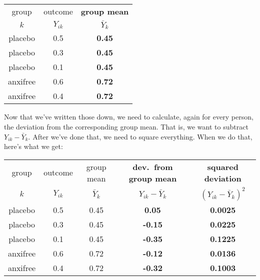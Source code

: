 \small
\vspace*{6pt}
\begin{tabular}{c|c|c} %
 group & outcome  & {\bf group mean} \\%
  $k$ &  $Y_{ik}$  & $\bar{Y}_k$ \\ \hline %
placebo  & 0.5  & {\bf 0.45} \\%
placebo  & 0.3 &  {\bf 0.45} \\%
placebo  &  0.1 &  {\bf 0.45} \\%
anxifree  & 0.6  & {\bf 0.72} \\%
anxifree  &  0.4 &  {\bf 0.72}\\%
\end{tabular}
\vspace*{6pt}
\normalsize

\noindent
Now that we've written those down, we need to calculate, again for every person, the deviation from the corresponding group mean. That is, we want to subtract $Y_{ik} - \bar{Y}_k$. After we've done that, we need to square everything. When we do that, here's what we get:

\small
\vspace*{6pt}
\begin{tabular}{c|c|c|c|c}
 group & outcome  & group mean & {\bf dev.\ from group mean} & {\bf squared deviation}\\  
  $k$ &  $Y_{ik}$  & $\bar{Y}_k$ & $Y_{ik} - \bar{Y}_{k}$ &  $(Y_{ik} - \bar{Y}_{k})^2$\\  \hline
placebo  & 0.5  & 0.45  & {\bf 0.05}  & {\bf 0.0025} \\
placebo  & 0.3 &  0.45 &  {\bf -0.15} & {\bf 0.0225}\\
placebo  &  0.1 &  0.45 &{\bf -0.35}  & {\bf 0.1225} \\
anxifree  & 0.6  & 0.72  & {\bf -0.12}  & {\bf 0.0136} \\
anxifree  &  0.4 &  0.72 & {\bf -0.32} & {\bf 0.1003} \\ 
\end{tabular}
\vspace*{6pt}
\normalsize

